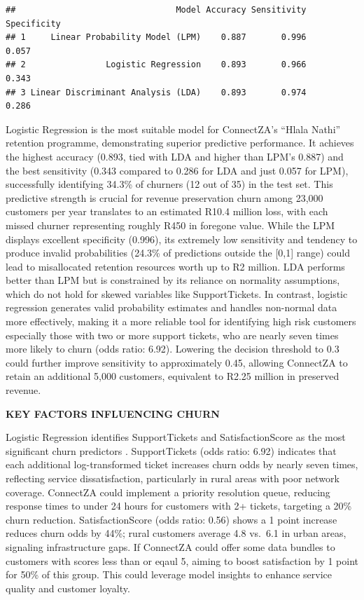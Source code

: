 \documentclass[
]{article}
\begin{document}
\begin{verbatim}
##                                Model Accuracy Sensitivity Specificity
## 1     Linear Probability Model (LPM)    0.887       0.996       0.057
## 2                Logistic Regression    0.893       0.966       0.343
## 3 Linear Discriminant Analysis (LDA)    0.893       0.974       0.286
\end{verbatim}

Logistic Regression is the most suitable model for ConnectZA's ``Hlala
Nathi'' retention programme, demonstrating superior predictive
performance. It achieves the highest accuracy (0.893, tied with LDA and
higher than LPM's 0.887) and the best sensitivity (0.343 compared to
0.286 for LDA and just 0.057 for LPM), successfully identifying 34.3\%
of churners (12 out of 35) in the test set. This predictive strength is
crucial for revenue preservation churn among 23,000 customers per year
translates to an estimated R10.4 million loss, with each missed churner
representing roughly R450 in foregone value. While the LPM displays
excellent specificity (0.996), its extremely low sensitivity and
tendency to produce invalid probabilities (24.3\% of predictions outside
the {[}0,1{]} range) could lead to misallocated retention resources
worth up to R2 million. LDA performs better than LPM but is constrained
by its reliance on normality assumptions, which do not hold for skewed
variables like SupportTickets. In contrast, logistic regression
generates valid probability estimates and handles non-normal data more
effectively, making it a more reliable tool for identifying high risk
customers especially those with two or more support tickets, who are
nearly seven times more likely to churn (odds ratio: 6.92). Lowering the
decision threshold to 0.3 could further improve sensitivity to
approximately 0.45, allowing ConnectZA to retain an additional 5,000
customers, equivalent to R2.25 million in preserved revenue.

\textbf{KEY FACTORS INFLUENCING CHURN}

Logistic Regression identifies SupportTickets and SatisfactionScore as
the most significant churn predictors . SupportTickets (odds ratio:
6.92) indicates that each additional log-transformed ticket increases
churn odds by nearly seven times, reflecting service dissatisfaction,
particularly in rural areas with poor network coverage. ConnectZA could
implement a priority resolution queue, reducing response times to under
24 hours for customers with 2+ tickets, targeting a 20\% churn
reduction. SatisfactionScore (odds ratio: 0.56) shows a 1 point increase
reduces churn odds by 44\%; rural customers average 4.8 vs.~6.1 in urban
areas, signaling infrastructure gaps. If ConnectZA could offer some data
bundles to customers with scores less than or eqaul 5, aiming to boost
satisfaction by 1 point for 50\% of this group. This could leverage
model insights to enhance service quality and customer loyalty.
\end{document}
